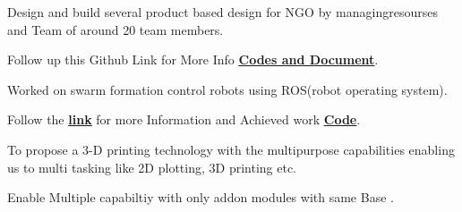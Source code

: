 \documentclass[]{font}
\begin{document}
\begin{minipage}[t]{0.69\textwidth}
\begin{tightemize}
\item Design and build several product based design for NGO by managingresourses and Team of around 20 team members.
\item Follow up this Github Link for More Info \textbf{\href{https://github.com/pranav083/Tinkering_project}{\underline{Codes and Document}}}.	
\end{tightemize}
\sectionsep

\begin{tightemize}
\item Worked on swarm formation control robots using ROS(robot operating system).
\item Follow the \textbf{\href{http://crip.ml}{\underline{link}}} for more  Information and Achieved work \textbf{\href{https://github.com/pranav083/ROS_work_earlier_nrf}{\underline{Code}}}.	
\end{tightemize}
\sectionsep

\begin{tightemize}
\item To propose a 3-D printing technology with the multipurpose
capabilities enabling us to multi tasking like 2D plotting, 3D printing etc.
\item Enable Multiple capabiltiy with only addon modules with same Base .
\end{tightemize}
\sectionsep



\end{minipage}
\end{document}
